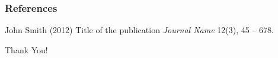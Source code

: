 \documentclass{beamer}
\begin{document}


\begin{frame}
\frametitle{ }

\end{frame}



\begin{frame}
\frametitle{References}
\footnotesize{
\begin{thebibliography}{99} %
 John Smith (2012)
\newblock Title of the publication
\newblock \emph{Journal Name} 12(3), 45 -- 678.
\end{thebibliography}
}
\end{frame}


\begin{frame}
\Huge{\centerline{Thank You!}}
\end{frame}

\end{document}
